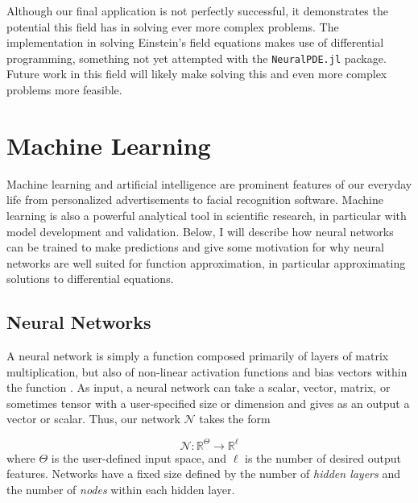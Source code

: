 \documentclass{CUP-JNL-DTM}%
\theoremstyle{definition}
\numberwithin{equation}{section}
\newcommand{\net}{\mathcal{N}}
\newcommand{\Define}{\emph}
\begin{document}
Although our final application is not perfectly successful, it demonstrates the potential this field has in solving ever more complex problems. The implementation in solving Einstein's field equations makes use of differential programming, something not yet attempted with the \texttt{NeuralPDE.jl} package. Future work in this field will likely make solving this and even more complex problems more feasible. 



\section{Machine Learning}
\label{sec:ML}

Machine learning and artificial intelligence are prominent features of our everyday life from personalized advertisements to facial recognition software. Machine learning is also a powerful analytical tool in scientific research, in particular with model development and validation. Below, I will describe how neural networks can be trained to make predictions and give some motivation for why neural networks are well suited for function approximation, in particular approximating solutions to differential equations. 


\subsection{Neural Networks}

A neural network is simply a function composed primarily of layers of matrix multiplication, but also of non-linear activation functions and bias vectors within the function \cite{strangLinearAlgebraLearning2019, bishopPatternRecognitionMachine2006}. As input, a neural network can take a scalar, vector, matrix, or sometimes tensor with a user-specified size or dimension and gives as an output a vector or scalar. Thus, our network $\net$ takes the form

\begin{equation}
    \net \colon \mathbb{R}^{\Theta} \rightarrow \mathbb{R}^{\ell}
\end{equation}
where $\Theta$ is the user-defined input space, and $\ell$ is the number of desired output features. Networks have a fixed size defined by the number of \Define{hidden layers} and the number of \Define{nodes} within each hidden layer. 
\end{document}
